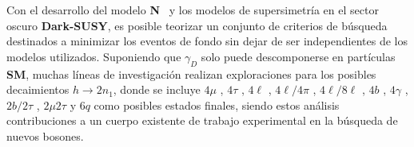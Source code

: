 Con el desarrollo del modelo \textbf{N}\MSSM ~ y los modelos de supersimetría en el sector oscuro \textbf{Dark-SUSY}, es posible teorizar un conjunto de criterios de búsqueda destinados a minimizar los eventos de fondo sin dejar de ser independientes de los modelos utilizados. Suponiendo que $\gamma_D$ solo puede descomponerse en partículas \textbf{SM}, %
muchas líneas de investigación realizan exploraciones para los posibles decaimientos $h \rightarrow 2n_1$, donde se incluye $4\mu$ \citep{cms_collaboration_search_2016,cms_collaboration_search_2013}
, $4\tau$ %
, $4\ell$ \citep{cms_collaboration_search_2018,lhcb_collaboration_search_2016}
, $4\ell/4\pi$ \citep{cms_collaboration_search_2018-1}
, $4\ell/8\ell$ \citep{atlas_collaboration_search_2016-2}
, $4b$ \citep{atlas_collaboration_search_2018-1,atlas_collaboration_search_2016-3}
, $4\gamma$ \citep{atlas_collaboration_search_2014}
, $2b/2\tau$ \citep{atlas_collaboration_search_2018-2}
, $2\mu 2\tau$ \citep{atlas_collaboration_search_2015-1}
y $6q$ \citep{cms_collaboration_search_2016-2} 
como posibles estados finales, siendo estos análisis contribuciones a un cuerpo existente de trabajo experimental en la búsqueda de nuevos bosones.

